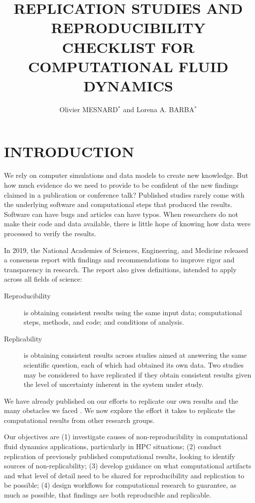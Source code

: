 \documentclass{parcfd}
\title{REPLICATION STUDIES AND REPRODUCIBILITY CHECKLIST FOR COMPUTATIONAL FLUID DYNAMICS}
\author{Olivier MESNARD$^{*}$ and Lorena A. BARBA$^{*}$}
\begin{document}

\section{INTRODUCTION}

We rely on computer simulations and data models to create new knowledge.
But how much evidence do we need to provide to be confident of the new findings claimed in a publication or conference talk?
Published studies rarely come with the underlying software and computational steps that produced the results.
Software can have bugs and articles can have typos.
When researchers do not make their code and data available, there is little hope of knowing how data were processed to verify the results.

In 2019, the National Academies of Sciences, Engineering, and Medicine released a consensus report \cite{nasem_2019} with findings and recommendations to improve rigor and transparency in research.
The report also gives definitions, intended to apply across all fields of science:

\begin{description}
    \item[Reproducibility] is obtaining consistent results using the same input data; computational steps, methods, and code; and conditions of analysis.
    \item[Replicability] is obtaining consistent results across studies aimed at answering the same scientific question, each of which had obtained its own data. Two studies may be considered to have replicated if they obtain consistent results given the level of uncertainty inherent in the system under study.
\end{description}

We have already published on our efforts to replicate our own results and the many obstacles we faced \cite{mesnard_barba_2017}.
We now explore the effort it takes to replicate the computational results from other research groups.

Our objectives are (1) investigate causes of non-reproducibility in computational fluid dynamics applications, particularly in HPC situations; (2) conduct replication of previously published computational results, looking to identify sources of non-replicability; (3) develop guidance on what computational artifacts and what level of detail need to be shared for reproducibility and replication to be possible; (4) design workflows for computational research to guarantee, as much as possible, that findings are both reproducible and replicable.
\end{document}
